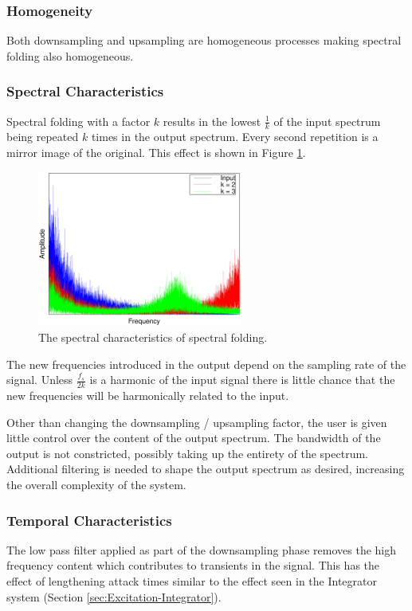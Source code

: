 		\subsubsection*{Homogeneity}
			Both downsampling and upsampling are homogeneous processes making spectral folding also
			homogeneous.
			
		\subsubsection*{Spectral Characteristics}
			Spectral folding with a factor $k$ results in the lowest $\frac{1}{k}$ of the input spectrum being
			repeated $k$ times in the output spectrum. Every second repetition is a mirror image of the
			original. This effect is shown in Figure \ref{fig:SpectralFolding}. 
			
			\begin{figure}[h!]
				\centering
				\includegraphics[width=0.6\textwidth]{chapter3/Images/SpectralFoldingSpectrum.eps}
				\caption{The spectral characteristics of spectral folding.}
				\label{fig:SpectralFolding}
			\end{figure}

			The new frequencies introduced in the output depend on the sampling rate of the signal. Unless
			$\frac{f_{s}}{2k}$ is a harmonic of the input signal there is little chance that the new
			frequencies will be harmonically related to the input.

			Other than changing the downsampling / upsampling factor, the user is given little control over the
			content of the output spectrum. The bandwidth of the output is not constricted, possibly taking up
			the entirety of the spectrum. Additional filtering is needed to shape the output spectrum as
			desired, increasing the overall complexity of the system.

		\subsubsection*{Temporal Characteristics}
			The low pass filter applied as part of the downsampling phase removes the high frequency content
			which contributes to transients in the signal. This has the effect of lengthening attack times
			similar to the effect seen in the Integrator system (Section \ref{sec:Excitation-Integrator}).

